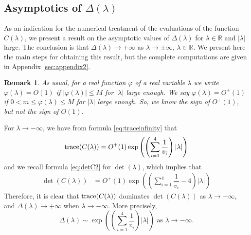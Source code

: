 \documentclass[a4paper]{article}
\newtheorem{rem}[thm]{Remark}
\newcommand{\R}{\ensuremath{\mathbb{R}}}
\numberwithin{equation}{section}
\begin{document}
\subsection{Asymptotics of $\Delta(\lambda)$}\label{sec:delta}
As an indication for the numerical treatment of the evaluations of the function $C(\lambda)$, we present a result on the asymptotic values of $\Delta(\lambda)$ for $\lambda\in\R$ and $|\lambda|$ large. The conclusion is that $\Delta(\lambda)\to +\infty$ as $\lambda\to\pm\infty$, $\lambda\in \R$. We present here the main steps for obtaining this result, but the complete computations are given in Appendix \ref{sec:appendix2}.
\begin{rem}\label{rem:Ogran}
As usual, for a real function $\varphi$ of a real variable $\lambda$ we write $\varphi(\lambda)=O(1)$ if $|\varphi(\lambda)|\le M$ for $|\lambda|$ large enough. We say $\varphi(\lambda)=O^+(1)$ if $0<m\le\varphi(\lambda)\le M$ for $|\lambda|$ large enough. So, we know the sign of $O^+(1)$, but not the sign of $O(1)$.
\end{rem}
For $\lambda \to -\infty$, we have from formula \eqref{eq:traceinfinity} that
\begin{equation}\label{traceminusinfty}
{\rm trace}(C(\lambda)) = O^+(1) \exp\left(\left(\sum_{i=1}^4\dfrac{1}{v_i}\right)|\lambda|\right)
\end{equation}
and we recall formula \eqref{eq:detC2} for $\det(\lambda)$, which implies that
\begin{align*}%
\det(C(\lambda)) &= O^+(1) \exp\left(  \left(\sum_{i=1}^4\dfrac{1}{v_i}-4 \right)|\lambda|    \right)
\end{align*}
Therefore, it is clear that ${\rm trace}(C(\lambda))$ dominates $\det(C(\lambda))$ as $\lambda\to -\infty$, and $\Delta(\lambda)\to +\infty$ when $\lambda\to -\infty$. More precisely,
$$\Delta(\lambda)\sim\exp\left(\left(\sum_{i=1}^4\dfrac{1}{v_i}\right)|\lambda|\right) \textrm{ as }\lambda\to -\infty.$$
\end{document}
